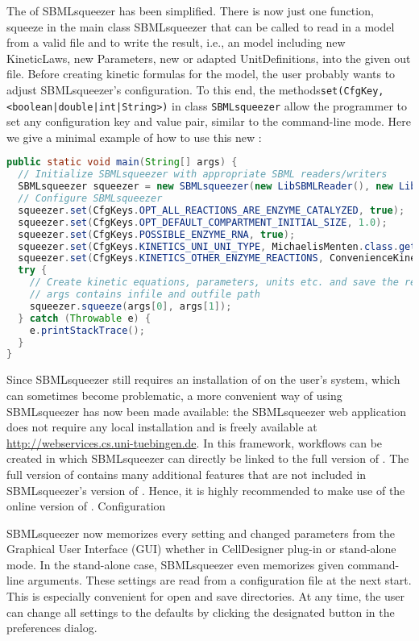 The \API of SBMLsqueezer has been simplified.
There is now just one function, squeeze in the main class SBMLsqueezer that can
be called to read in a model from a valid \SBML file and to write the result,
i.e., an \SBML model including new KineticLaws, new Parameters, new or adapted
UnitDefinitions, into the given out file. Before creating kinetic formulas for
the model, the user probably wants to adjust SBMLsqueezer's configuration.
To this end, the methods\texttt{set(CfgKey, <boolean|double|int|String>)} in class
\texttt{SBMLsqueezer} allow the programmer to set any configuration key and value pair,
similar to the command-line mode. Here we give a minimal example of how to use
this new \API:
\begin{lstlisting}[language=Java]
public static void main(String[] args) {
  // Initialize SBMLsqueezer with appropriate SBML readers/writers
  SBMLsqueezer squeezer = new SBMLsqueezer(new LibSBMLReader(), new LibSBMLWriter());
  // Configure SBMLsqueezer
  squeezer.set(CfgKeys.OPT_ALL_REACTIONS_ARE_ENZYME_CATALYZED, true);
  squeezer.set(CfgKeys.OPT_DEFAULT_COMPARTMENT_INITIAL_SIZE, 1.0);
  squeezer.set(CfgKeys.POSSIBLE_ENZYME_RNA, true);
  squeezer.set(CfgKeys.KINETICS_UNI_UNI_TYPE, MichaelisMenten.class.getName());
  squeezer.set(CfgKeys.KINETICS_OTHER_ENZYME_REACTIONS, ConvenienceKinetics.class.getName());
  try {
    // Create kinetic equations, parameters, units etc. and save the result
    // args contains infile and outfile path
    squeezer.squeeze(args[0], args[1]);
  } catch (Throwable e) {
    e.printStackTrace();
  }
}
\end{lstlisting}
Since SBMLsqueezer still requires an installation of \libSBML on the user's
system, which can sometimes become problematic, a more convenient way of using
SBMLsqueezer has now been made available: the SBMLsqueezer web application does
not require any local installation and is freely available at
\url{http://webservices.cs.uni-tuebingen.de}. In this framework, workflows can
be created in which SBMLsqueezer can directly be linked to the full version of
\SBMLLaTeX. The full version of \SBMLLaTeX contains many additional features
that are not included in SBMLsqueezer's version of \SBMLLaTeX. Hence, it is
highly recommended to make use of the online version of \SBMLLaTeX.
Configuration

SBMLsqueezer now memorizes every setting and changed parameters from the
Graphical User Interface (GUI) whether in CellDesigner plug-in or stand-alone
mode. In the stand-alone case, SBMLsqueezer even memorizes given command-line
arguments. These settings are read from a configuration file at the next start.
This is especially convenient for open and save directories. At any time, the
user can change all settings to the defaults by clicking the designated button
in the preferences dialog.

